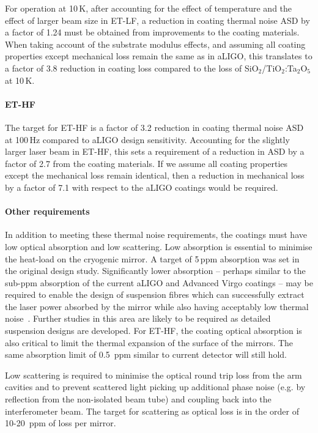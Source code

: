 For operation at 10\,K, after  accounting for the effect of  temperature and the effect of  larger beam size in ET-LF, a reduction in coating thermal noise ASD by a factor of 1.24 must be obtained from improvements to the coating materials. When taking account of the substrate modulus effects, and assuming all coating properties except mechanical loss remain the same as in aLIGO, this translates to a factor of 3.8 reduction in coating loss compared to the loss of SiO$_2$/TiO$_2$:Ta$_2$O$_5$ at 10\,K.

\paragraph{ET-HF}
The target for ET-HF is a factor of 3.2 reduction in coating thermal noise ASD at 100\,Hz compared to aLIGO design sensitivity. Accounting for the slightly larger laser beam in ET-HF, this sets a requirement of a reduction in ASD by a factor of 2.7 from the coating materials. If we assume all coating properties except the mechanical loss remain identical, then a reduction in mechanical loss by a factor of 7.1 with respect to the aLIGO coatings would be required.

\paragraph{Other requirements}
In addition to meeting these thermal noise requirements, the coatings must have low optical absorption and low scattering. Low absorption is essential to minimise the heat-load on the cryogenic mirror. A target of 5\,ppm absorption was set in the original design study. Significantly lower absorption -- perhaps similar to the sub-ppm absorption of the current aLIGO and Advanced Virgo coatings -- may be required to enable the design of suspension fibres which can successfully extract the laser power absorbed by the mirror while also having acceptably low thermal noise~\cite{Cumming_2013}. Further studies in this area are likely to be required as detailed suspension designs are developed. 
For ET-HF, the coating optical absorption is also critical to limit the thermal expansion of the surface of the mirrors. The same absorption limit of 0.5~ppm similar to current detector will still hold.

Low scattering is required to minimise the optical round trip loss from the arm cavities and to prevent scattered light picking up additional phase noise (e.g. by reflection from the non-isolated beam tube) and coupling back into the interferometer beam. The target for scattering as optical loss is in the order of 10-20~ppm of loss per mirror.


